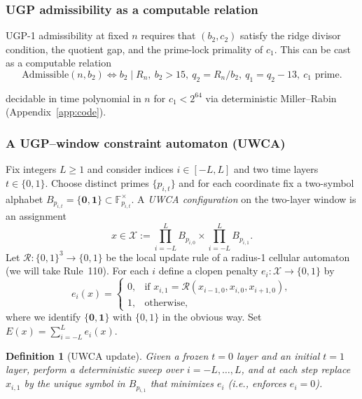 \documentclass[12pt]{article}
\newtheorem{definition}[theorem]{Definition}
\numberwithin{equation}{section}
\begin{document}
\subsubsection{UGP admissibility as a computable relation}
UGP-1 admissibility at fixed $n$ requires that $(b_2,c_2)$ satisfy the ridge divisor condition, the quotient gap, and the prime-lock primality of $c_1$. This can be cast as a computable relation
\[
\mathrm{Admissible}(n,b_2)\iff b_2\mid R_n,\ b_2>15,\ q_2=R_n/b_2,\ q_1=q_2-13,\ \text{$c_1$ prime}.
\]

decidable in time polynomial in $n$ for $c_1<2^{64}$ via deterministic Miller–Rabin (Appendix~\ref{app:code}).

\subsubsection{A UGP--window constraint automaton (UWCA)}\label{subsec:uwca}

Fix integers $L\ge 1$ and consider indices $i\in [-L,L]$ and two time layers $t\in\{0,1\}$. Choose distinct primes $\{p_{i,t}\}$ and for each coordinate fix a two-symbol alphabet $B_{p_{i,t}}=\{\mathbf{0},\mathbf{1}\}\subset\mathbb{F}_{p_{i,t}}^{\times}$. A \emph{UWCA configuration} on the two-layer window is an assignment
\[
x \in \mathscr{X} := \prod_{i=-L}^{L} B_{p_{i,0}} \times \prod_{i=-L}^{L} B_{p_{i,1}}.
\]
Let $\mathcal{R}:\{0,1\}^3\to\{0,1\}$ be the local update rule of a radius-1 cellular automaton (we will take Rule~110). For each $i$ define a clopen penalty $e_i:\mathscr{X}\to\{0,1\}$ by
\[
e_i(x)=
\begin{cases}
0,& \text{if } x_{i,1}=\mathbf{\mathcal{R}}(x_{i-1,0},x_{i,0},x_{i+1,0}),\\
1,& \text{otherwise},
\end{cases}
\]
where we identify $\{\mathbf{0},\mathbf{1}\}$ with $\{0,1\}$ in the obvious way. Set $E(x)=\sum_{i=-L}^{L} e_i(x)$.

\begin{definition}[UWCA update]
Given a frozen $t{=}0$ layer and an initial $t{=}1$ layer, perform a deterministic sweep over $i=-L,\dots,L$, and at each step replace $x_{i,1}$ by the unique symbol in $B_{p_{i,1}}$ that minimizes $e_i$ (i.e., enforces $e_i=0$).
\end{definition}
\end{document}

